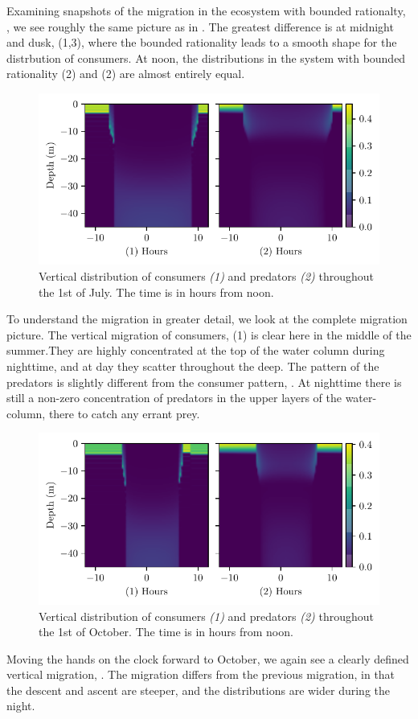 Examining snapshots of the migration in the ecosystem with bounded rationalty, , we see roughly the same picture as in . The greatest difference is at midnight and dusk, (1,3), where the bounded rationality leads to a smooth shape for the distrbution of consumers. At noon, the distributions in the system with bounded rationality (2) and (2) are almost entirely equal.
\begin{figure}[H]
\includegraphics{plots/heatmapsday90_nonrandom.pdf}
\caption{Vertical distribution of consumers \emph{(1)} and predators \emph{(2)} throughout the 1st of July. The time is in hours from noon. }
\label{fig:heatmaps_90_nonrandom}
\end{figure}
To understand the migration in greater detail, we look at the complete migration picture.
The vertical migration of consumers, (1) is clear here in the middle of the summer.They are highly concentrated at the top of the water column during nighttime, and at day they scatter throughout the deep. The pattern of the predators is slightly different from the consumer pattern, . At nighttime there is still a non-zero concentration of predators in the upper layers of the water-column, there to catch any errant prey.
\begin{figure}[H]
\includegraphics{plots/heatmapsday180_nonrandom.pdf}
\caption{Vertical distribution of consumers \emph{(1)} and predators \emph{(2)} throughout the 1st of October. The time is in hours from noon.}
\label{fig:heatmaps_180_nonrandom}
\end{figure}
Moving the hands on the clock forward to October, we again see a clearly defined vertical migration, . The migration differs from the previous migration, in that the descent and ascent are steeper, and the distributions are wider during the night.

